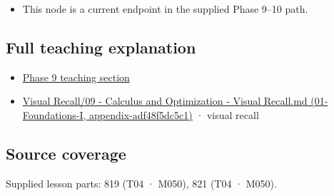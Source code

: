 \begin{itemize}
\tightlist
\item
  This node is a current endpoint in the supplied Phase 9--10 path.
\end{itemize}

\subsection{Full teaching explanation}\label{appendix-e2d476574aab-full-teaching-explanation}

\begin{itemize}
\tightlist
\item
  \hyperref[02-foundations-ii-ch021-multivariable-derivatives-and-sensitivity-1]{Phase 9 teaching section}
\item
  \href{../01-Foundations-I/main.pdf\#nameddest=appendix-adf48f5dc5c1}{Visual Recall/09 - Calculus and Optimization - Visual Recall.md (01-Foundations-I, appendix-adf48f5dc5c1)} · visual recall
\end{itemize}

\subsection{Source coverage}\label{appendix-e2d476574aab-source-coverage}

Supplied lesson parts: 819 (T04 · M050), 821 (T04 · M050).
